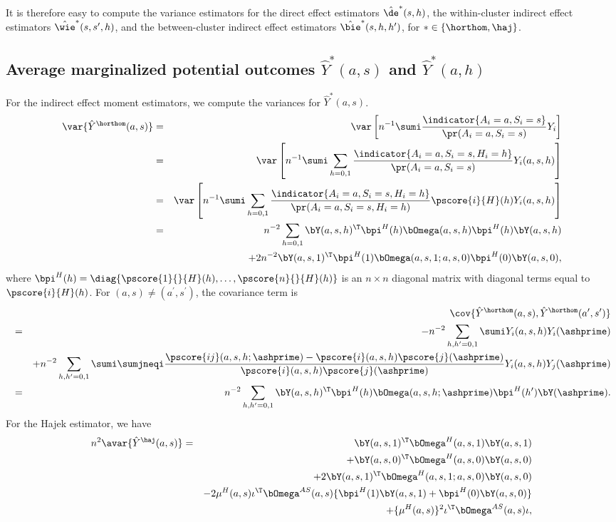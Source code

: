     It is therefore easy to compute the variance estimators for the direct effect estimators $\hat{\de}^{*}(s,h)$, the within-cluster indirect effect estimators $\hat{\wie}^{*}(s,s^{\prime},h)$, and the between-cluster indirect effect estimators $\hat{\bie}^{*}(s,h,h^{\prime})$, for $*\in\{\horthom,\haj\}$.


    \subsection{Average marginalized potential outcomes $\hat Y^{*}(a,s)$ and $\hat Y^{*}(a,h)$}
For the indirect effect moment estimators, we compute the variances for $\hat{Y}^{*}(a,s)$.
\begin{eqnarray*}
    \var\{\hat{Y}^{\horthom}(a,s)\} &=& \var \left[ n^{-1}\sumi\frac{ \indicator\{A_{i}=a, S_{i}=s\} }{ \pr(A_{i}=a, S_{i}=s)}Y_{i}\right] \\
    &=& \var \left[ n^{-1}\sumi\sum_{h=0,1}\frac{ \indicator\{A_{i}=a, S_{i}=s,H_i=h\} }{ \pr(A_{i}=a, S_{i}=s)}Y_{i}(a,s,h)\right] \\
    &=& \var \left[ n^{-1}\sumi\sum_{h=0,1}\frac{ \indicator\{A_{i}=a, S_{i}=s,H_i=h\} }{ \pr(A_{i}=a, S_{i}=s, H_{i}=h)}\pscore{i}{H}(h)Y_{i}(a,s,h)\right] \\
    &=& n^{-2} \sum_{h=0,1}\bY(a,s,h)^{\T}\bpi^{H}(h)\bOmega(a,s,h)\bpi^{H}(h)\bY(a,s,h) \\
    &&+ 2n^{-2}\bY(a,s,1)^{\T}\bpi^{H}(1)\bOmega(a,s,1;a,s,0)\bpi^{H}(0)\bY(a,s,0),
\end{eqnarray*}
where $\bpi^{H}(h) = \diag\{\pscore{1}{}{H}(h), \ldots, \pscore{n}{}{H}(h)\}$ is an $n\times n$ diagonal matrix with diagonal terms equal to $\pscore{i}{H}(h)$.
For $(a,s)\neq(a^{\prime},s^{\prime})$, the covariance term is
\begin{eqnarray*}
    && \cov\{\hat{Y}^{\horthom}(a,s), \hat{Y}^{\horthom}(a^{\prime},s^{\prime})\} \\
    &=& -n^{-2}\sum_{h,h^{\prime}=0,1}\sumi  Y_i(a, s, h) Y_i(\ashprime) \\ 
    &&+ n^{-2}\sum_{h,h^{\prime}=0,1}\sumi\sumjneqi \frac{\pscore{ij}(a, s, h; \ashprime) - \pscore{i}(a, s, h)\pscore{j}(\ashprime)}{\pscore{i}(a, s, h)\pscore{j}(\ashprime)} Y_i(a, s, h) Y_j(\ashprime) \\
    &=& n^{-2}\sum_{h, h^{\prime}=0,1} \bY(a,s,h)^{\T} \bpi^{H}(h)\bOmega(a,s,h;\ashprime)\bpi^{H}(h^{\prime}) \bY(\ashprime).
\end{eqnarray*}
For the Hajek estimator, we have
\begin{eqnarray*}
    n^2\avar\{\hat Y^{\haj}(a,s)\} &=& \bY(a,s,1)^{\T} \bOmega^{H}(a,s,1) \bY(a,s,1) \\
    &&+ \bY(a,s,0)^{\T} \bOmega^{H}(a,s,0) \bY(a,s,0) \\
    &&+ 2\bY(a,s,1)^{\T} \bOmega^{H}(a,s,1;a,s,0) \bY(a,s,0) \\
    &&- 2\mu^{H}(a,s) \iota^{\T} \bOmega^{AS}(a,s) \{\bpi^{H}(1)\bY(a,s,1) + \bpi^{H}(0)\bY(a,s,0)\} \\
    &&+ \{\mu^{H}(a,s)\}^2 \iota^{\T} \bOmega^{AS}(a,s) \iota,
\end{eqnarray*}
